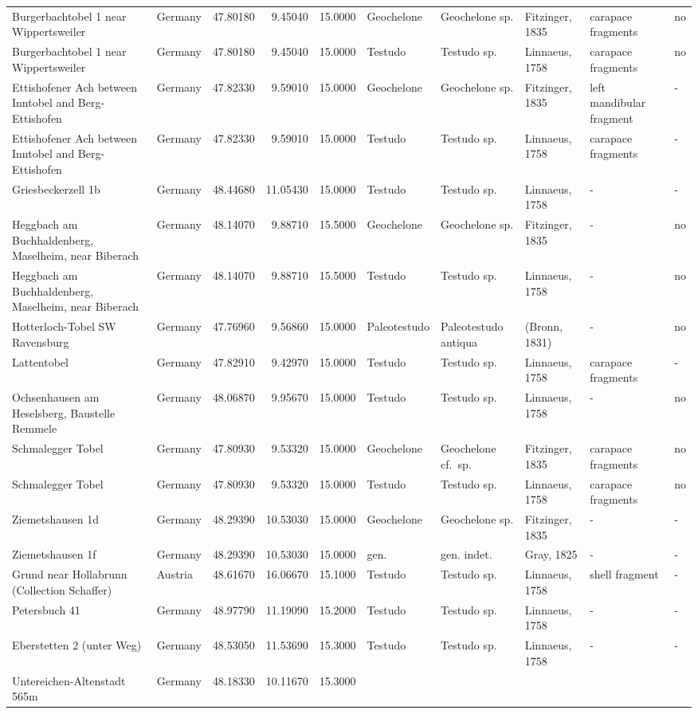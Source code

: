\begin{landscape}
{\begin{longtable}[]{@{}llrrrlllll@{}}
Burgerbachtobel 1 near Wippertsweiler & Germany & 47.80180 & 9.45040 &
15.0000 & Geochelone & Geochelone sp. & Fitzinger, 1835 & carapace
fragments & no\tabularnewline
Burgerbachtobel 1 near Wippertsweiler & Germany & 47.80180 & 9.45040 &
15.0000 & Testudo & Testudo sp. & Linnaeus, 1758 & carapace fragments &
no\tabularnewline
Ettishofener Ach between Inntobel and Berg-Ettishofen & Germany &
47.82330 & 9.59010 & 15.0000 & Geochelone & Geochelone sp. & Fitzinger,
1835 & left mandibular fragment & -\tabularnewline
Ettishofener Ach between Inntobel and Berg-Ettishofen & Germany &
47.82330 & 9.59010 & 15.0000 & Testudo & Testudo sp. & Linnaeus, 1758 &
carapace fragments & -\tabularnewline
Griesbeckerzell 1b & Germany & 48.44680 & 11.05430 & 15.0000 & Testudo &
Testudo sp. & Linnaeus, 1758 & - & -\tabularnewline
Heggbach am Buchhaldenberg, Maselheim, near Biberach & Germany &
48.14070 & 9.88710 & 15.5000 & Geochelone & Geochelone sp. & Fitzinger,
1835 & - & no\tabularnewline
Heggbach am Buchhaldenberg, Maselheim, near Biberach & Germany &
48.14070 & 9.88710 & 15.5000 & Testudo & Testudo sp. & Linnaeus, 1758 &
- & no\tabularnewline
Hotterloch-Tobel SW Ravensburg & Germany & 47.76960 & 9.56860 & 15.0000
& Paleotestudo & Paleotestudo antiqua & (Bronn, 1831) & - &
no\tabularnewline
Lattentobel & Germany & 47.82910 & 9.42970 & 15.0000 & Testudo & Testudo
sp. & Linnaeus, 1758 & carapace fragments & -\tabularnewline
Ochsenhausen am Heselsberg, Baustelle Remmele & Germany & 48.06870 &
9.95670 & 15.0000 & Testudo & Testudo sp. & Linnaeus, 1758 & - &
no\tabularnewline
Schmalegger Tobel & Germany & 47.80930 & 9.53320 & 15.0000 & Geochelone
& Geochelone cf.~sp. & Fitzinger, 1835 & carapace fragments &
no\tabularnewline
Schmalegger Tobel & Germany & 47.80930 & 9.53320 & 15.0000 & Testudo &
Testudo sp. & Linnaeus, 1758 & carapace fragments & no\tabularnewline
Ziemetshausen 1d & Germany & 48.29390 & 10.53030 & 15.0000 & Geochelone
& Geochelone sp. & Fitzinger, 1835 & - & -\tabularnewline
Ziemetshausen 1f & Germany & 48.29390 & 10.53030 & 15.0000 & gen. & gen.
indet. & Gray, 1825 & - & -\tabularnewline
Grund near Hollabrunn (Collection Schaffer) & Austria & 48.61670 &
16.06670 & 15.1000 & Testudo & Testudo sp. & Linnaeus, 1758 & shell
fragment & -\tabularnewline
Petersbuch 41 & Germany & 48.97790 & 11.19090 & 15.2000 & Testudo &
Testudo sp. & Linnaeus, 1758 & - & -\tabularnewline
Eberstetten 2 (unter Weg) & Germany & 48.53050 & 11.53690 & 15.3000 &
Testudo & Testudo sp. & Linnaeus, 1758 & - & -\tabularnewline
Untereichen-Altenstadt 565m & Germany & 48.18330 & 10.11670 & 15.3000 &

\end{longtable}}
\end{landscape}
